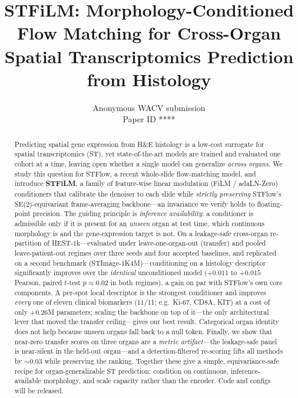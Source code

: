 \documentclass[10pt,twocolumn,letterpaper]{article}
\def\paperID{****}
\begin{document}
\title{STFiLM: Morphology-Conditioned Flow Matching for Cross-Organ\\
Spatial Transcriptomics Prediction from Histology}

\author{Anonymous WACV submission\\
Paper ID \paperID}
\maketitle

\begin{abstract}
Predicting spatial gene expression from H\&E histology is a low-cost surrogate for spatial
transcriptomics (ST), yet state-of-the-art models are trained and evaluated one cohort at a time,
leaving open whether a single model can generalize \emph{across organs}. We study this question for
STFlow, a recent whole-slide flow-matching model, and introduce \textbf{STFiLM}, a family of
feature-wise linear modulation (FiLM / adaLN-Zero) conditioners that calibrate the denoiser to each
slide while \emph{strictly preserving} STFlow's SE(2)-equivariant frame-averaging backbone---an
invariance we verify holds to floating-point precision. The guiding principle is \emph{inference
availability}: a conditioner is admissible only if it is present for an \emph{unseen} organ at test
time, which continuous morphology is and the gene-expression target is not. On a leakage-safe
cross-organ re-partition of HEST-1k---evaluated under leave-one-organ-out (transfer) and pooled
leave-patient-out regimes over three seeds and four accepted baselines, and replicated on a second
benchmark (STImage-1K4M)---conditioning on a histology descriptor significantly improves over the
\emph{identical} unconditioned model ($+0.011$ to $+0.015$ Pearson, paired $t$-test
$p\!\approx\!0.02$ in both regimes), a gain on par with STFlow's own core components. A per-spot
local descriptor is the strongest conditioner and improves \emph{every} one of eleven clinical
biomarkers (11/11; e.g.\ Ki-67, CD8A, KIT) at a cost of only $+0.26$M parameters; scaling the
backbone on top of it---the only architectural lever that moved the transfer ceiling---gives our
best result. Categorical organ identity does not help because unseen organs fall back to a null
token. Finally, we show that near-zero transfer scores on three organs are a \emph{metric
artifact}---the leakage-safe panel is near-silent in the held-out organ---and a detection-filtered
re-scoring lifts all methods by ${\sim}0.03$ while preserving the ranking. Together these give a
simple, equivariance-safe recipe for organ-generalizable ST prediction: condition on continuous,
inference-available morphology, and scale capacity rather than the encoder. Code and configs will be
released.
\end{abstract}
\end{document}

